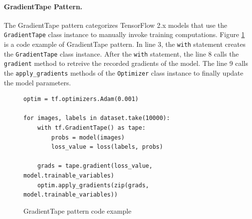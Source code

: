 

\paragraph{GradientTape Pattern.}
The GradientTape pattern categorizes TensorFlow 2.x models that
use the {\tt GradientTape} class instance to manually invoke training 
computations. Figure \ref{fig:tapepattern} is a code example of 
GradientTape pattern.
In line 3, the {\tt with} statement creates the {\tt GradientTape} class
instance. 
After the {\tt with} statement, the line 8 calls the {\tt gradient} method
to retreive the recorded gradients of the model.
The line 9 calls the {\tt apply\_gradients} methods of the {\tt Optimizer}
class instance to finally update the model parameters.

\begin{figure}[!ht]
  \begin{lstlisting}[style=mpython]
optim = tf.optimizers.Adam(0.001)

for images, labels in dataset.take(10000):
    with tf.GradientTape() as tape:
        probs = model(images)
        loss_value = loss(labels, probs)

    grads = tape.gradient(loss_value, model.trainable_variables)
    optim.apply_gradients(zip(grads, model.trainable_variables))\end{lstlisting}
  \caption{GradientTape pattern code example}
  \label{fig:tapepattern}
\end{figure}




